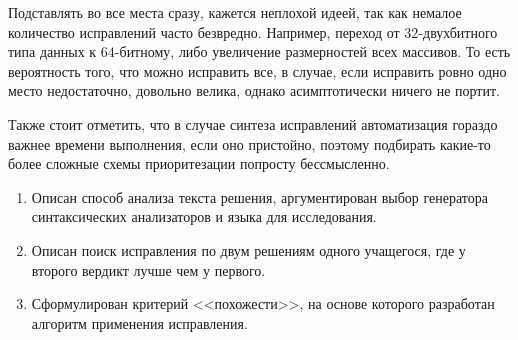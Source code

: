 Подставлять во все места сразу, кажется неплохой идеей, так как немалое количество исправлений часто безвредно.
Например, переход от $32$-двухбитного типа данных к $64$-битному, либо увеличение размерностей всех массивов.
То есть вероятность того, что можно исправить все, в случае, если исправить ровно одно место недостаточно, довольно велика,
однако асимптотически ничего не портит.

Также стоит отметить, что в случае синтеза исправлений автоматизация гораздо важнее времени выполнения, если оно пристойно, поэтому
подбирать какие-то более сложные схемы приоритезации попросту бессмысленно.

\chapterconclusion

\begin{enumerate}
    \item Описан способ анализа текста решения, аргументирован выбор генератора синтаксических анализаторов и языка для исследования.
    \item Описан поиск исправления по двум решениям одного учащегося, где у второго вердикт лучше чем у первого.
    \item Сформулирован критерий <<похожести>>, на основе которого разработан алгоритм применения исправления.
\end{enumerate}
